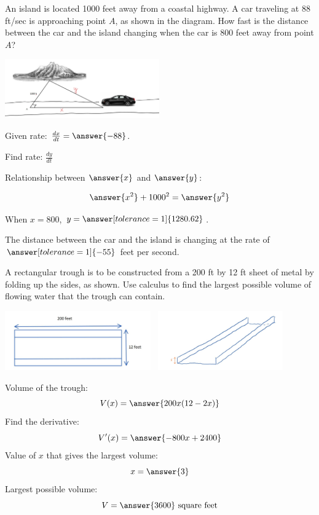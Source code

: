 \documentclass{ximera}
\begin{document}
\begin{problem}\label{prob:mth240exam2prob2}
An island is located 1000 feet away from a coastal highway.  A car traveling at 88 ft/sec is approaching point $A$, as shown in the diagram.  How fast is the distance between the car and the island changing when the car is 800 feet away from point $A$?
\begin{image}
   
\includegraphics[height=1in]{Inkedtest2image4.jpg}~
 
\end{image}

Given rate: $\frac{dx}{dt}=\answer{-88}$.

Find rate:  $\frac{dy}{dt}$

Relationship between $\answer{x}$ and $\answer{y}$:

$$\answer{x^2}+1000^2=\answer{y^2}$$

When $x=800$, $y=\answer[tolerance=1]{1280.62}$.

The distance between the car and the island is changing at the rate of $\answer[tolerance=1]{-55}$ feet per second.
\end{problem}

\begin{problem}\label{prob:mth240exam2prob3}
A rectangular trough is to be constructed from a 200 ft by 12 ft sheet of metal by folding up the sides, as shown.  Use calculus to find the largest possible volume of flowing water that the trough can contain.

\begin{image}
   
\includegraphics[height=1in]{test2image2.jpg}~
\includegraphics[height=1in]{Inkedtest2image3.jpg}~

\end{image}
Volume of the trough:
$$V(x)=\answer{200x(12-2x)}$$
Find the derivative:
$$V'(x)=\answer{-800x+2400}$$
Value of $x$ that gives the largest volume:
$$x=\answer{3}$$
Largest possible volume:
$$V=\answer{3600}\mbox{ square feet}$$

\end{problem}
\end{document}
